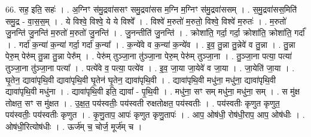 \documentclass[17pt]{extarticle}
\begin{document}
66. सह॒ इति॒ सहः॑ । . अ॒ग्निꣳ स॑मु॒द्रवा॑ससꣳ समु॒द्रवा॑सस म॒ग्नि म॒ग्निꣳ स॑मु॒द्रवा॑ससम् । . स॒मु॒द्रवा॑सस॒मिति॑ समु॒द्र - वा॒स॒स॒म् । . ये विश्वे॒ विश्वे॒ ये ये विश्वे᳚ । . विश्वे॑ म॒रुतो॑ म॒रुतो॒ विश्वे॒ विश्वे॑ म॒रुतः॑ । . म॒रुतो॑ जु॒नन्ति॑ जु॒नन्ति॑ म॒रुतो॑ म॒रुतो॑ जु॒नन्ति॑ । . जु॒नन्तीति॑ जु॒नन्ति॑ । . क्रोशा॑ति॒ गर्दा॒ गर्दा॒ क्रोशा॑ति॒ क्रोशा॑ति॒ गर्दा᳚ । . गर्दा॑ क॒न्या॑ क॒न्या॑ गर्दा॒ गर्दा॑ क॒न्या᳚ । . क॒न्ये॑वे व क॒न्या॑ क॒न्ये॑व । . इ॒व॒ तु॒न्ना तु॒न्नेवे॑ व तु॒न्ना । . तु॒न्ना पेरु॒म् पेरु॑म् तु॒न्ना तु॒न्ना पेरु᳚म् । . पेरु॑म् तुञ्जा॒ना तु॑ञ्जा॒ना पेरु॒म् पेरु॑म् तुञ्जा॒ना । . तु॒ञ्जा॒ना पत्या॒ पत्या॑ तुञ्जा॒ना तु॑ञ्जा॒ना पत्या᳚ । . पत्ये॑वे व॒ पत्या॒ पत्ये॑व । . इ॒व॒ जा॒या जा॒येवे॑ व जा॒या । . जा॒येति॑ जा॒या । . घृ॒तेन॒ द्यावा॑पृथि॒वी द्यावा॑पृथि॒वी घृ॒तेन॑ घृ॒तेन॒ द्यावा॑पृथि॒वी । . द्यावा॑पृथि॒वी मधु॑ना॒ मधु॑ना॒ द्यावा॑पृथि॒वी द्यावा॑पृथि॒वी मधु॑ना । . द्यावा॑पृथि॒वी इति॒ द्यावा᳚ - पृ॒थि॒वी । . मधु॑ना॒ सꣳ सम् मधु॑ना॒ मधु॑ना॒ सम् । . स मु॑क्ष तोक्षत॒ सꣳ स मु॑क्षत । . उ॒क्ष॒त॒ पय॑स्वतीः॒ पय॑स्वती रुक्षतोक्षत॒ पय॑स्वतीः । . पय॑स्वतीः कृणुत कृणुत॒ पय॑स्वतीः॒ पय॑स्वतीः कृणुत । . कृ॒णु॒ताप॒ आपः॑ कृणुत कृणु॒तापः॑ । . आप॒ ओष॑धी॒ रोष॑धी॒राप॒ आप॒ ओष॑धीः । . ओष॑धी॒रित्योष॑धीः । . ऊर्ज॑म् च॒ चोर्ज॒ मूर्ज॑म् च । \newline
\end{document}
